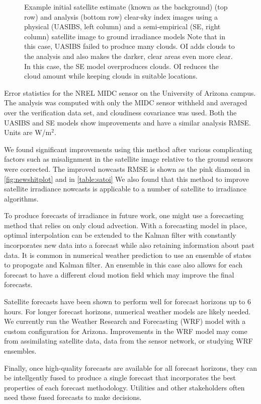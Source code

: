 \begin{figure}[htb]
\caption[Improved satellite irradiance estimates using optimal
interpolation]{Example initial satellite estimate (known as the
  background) (top row) and analysis (bottom row) clear-sky index
  images using a physical (UASIBS, left column) and a semi-empirical
  (SE, right column) satellite image to ground irradiance models Note
  that in this case, UASIBS failed to produce many clouds. OI adds
  clouds to the analysis and also makes the darker, clear areas even
  more clear.  In this case, the SE model overproduces clouds. OI
  reduces the cloud amount while keeping clouds in suitable
  locations.}
\label{fig:oi_example}
\end{figure}

\begin{table}[htb]
  \caption{Error statistics for the NREL MIDC sensor on the University
    of Arizona campus. The analysis was computed with only the MIDC
    sensor withheld and averaged over the verification data set, and
    cloudiness covariance was used. Both the
    UASIBS and SE models show improvements and have a similar
    analysis RMSE\@. Units are W/m$^2$.}
\label{table:satoi}
\vspace{0.5em}

\centering
\end{table}


We found significant improvements using this method after various
complicating factors such as misalignment in the satellite image
relative to the ground sensors were corrected.
The improved nowcasts RMSE is shown as the pink diamond in
\cref{fig:newshitplot} and in \cref{table:satoi}
We also found that this method to improve satellite irradiance
nowcasts is applicable to a number of satellite to irradiance
algorithms.

To produce forecasts of irradiance in future work, one might use a
forecasting method that relies on only cloud advection.
With a forecasting model in place, optimal interpolation can be
extended to the Kalman filter with constantly incorporates new data
into a forecast while also retaining information about past data.
It is common in numerical weather prediction to use an ensemble of
states to propogate and Kalman filter.
An ensemble in this case also allows for each forecast to have a
different cloud motion field which may improve the final forecasts.

Satellite forecasts have been shown to perform well for forecast
horizons up to 6 hours.
For longer forecast horizons, numerical weather models are likely
needed.
We currently run the Weather Research and Forecasting (WRF) model with
a custom configuration for Arizona.
Improvements in the WRF model may come from assimilating satellite
data, data from the sensor network, or studying WRF ensembles.

Finally, once high-quality forecasts are available for all forecast
horizons, they can be intellgently fused to produce a single forecast
that incorporates the best properties of each forecast methodology.
Utilities and other stakeholders often need these fused forecasts to
make decisions.


